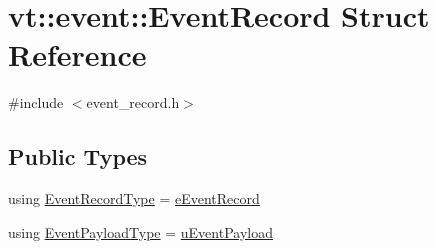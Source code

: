 \hypertarget{structvt_1_1event_1_1_event_record}{}\section{vt\+:\+:event\+:\+:Event\+Record Struct Reference}
\label{structvt_1_1event_1_1_event_record}


{\ttfamily \#include $<$event\+\_\+record.\+h$>$}

\subsection*{Public Types}
\begin{DoxyCompactItemize}
\item 
using \hyperlink{structvt_1_1event_1_1_event_record_a1cd26c3c87c96eced8f474fa4fdab47e}{Event\+Record\+Type} = \hyperlink{namespacevt_1_1event_a1ea9fec44d101bf40b8fd786d44ebed9}{e\+Event\+Record}
\item 
using \hyperlink{structvt_1_1event_1_1_event_record_aecf5b6b386947ef5f0d5bf410d0b2944}{Event\+Payload\+Type} = \hyperlink{unionvt_1_1event_1_1u_event_payload}{u\+Event\+Payload}
\end{DoxyCompactItemize}
